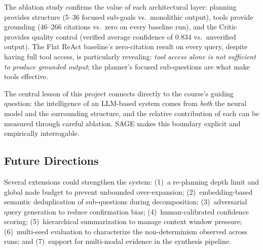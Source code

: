 \documentclass[11pt]{article}
\begin{document}
The ablation study confirms the value of each architectural layer: planning provides structure (5--36 focused sub-goals vs.\ monolithic output), tools provide grounding (46--266 citations vs.\ zero on every baseline run), and the Critic provides quality control (verified average confidence of 0.834 vs.\ unverified output). The Flat ReAct baseline's zero-citation result on every query, despite having full tool access, is particularly revealing: \emph{tool access alone is not sufficient to produce grounded output}; the planner's focused sub-questions are what make tools effective.

The central lesson of this project connects directly to the course's guiding question: the intelligence of an LLM-based system comes from \emph{both} the neural model and the surrounding structure, and the relative contribution of each can be measured through careful ablation. SAGE makes this boundary explicit and empirically interrogable.

\subsection{Future Directions}

Several extensions could strengthen the system: (1)~a re-planning depth limit and global node budget to prevent unbounded over-expansion; (2)~embedding-based semantic deduplication of sub-questions during decomposition; (3)~adversarial query generation to reduce confirmation bias; (4)~human-calibrated confidence scoring; (5)~hierarchical summarization to manage context window pressure; (6)~multi-seed evaluation to characterize the non-determinism observed across runs; and (7)~support for multi-modal evidence in the synthesis pipeline.

\end{document}
